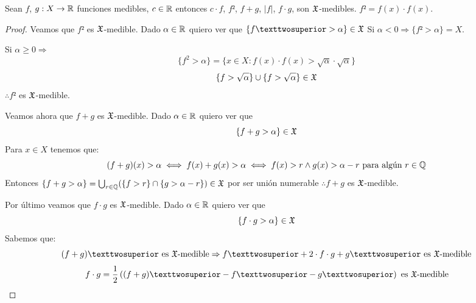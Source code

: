 \begin{lemma}
    Sean \(f\), \(g: X \to \mathbb{R}\) funciones medibles, \(c \in \mathbb{R}\) entonces \(c \cdot f\), \(f²\), \(f + g\), \(|f|\), \(f \cdot g\), son \(\mathfrak{X}\)-medibles.
    \(f² = f(x) \cdot f(x)\).
    \begin{proof}
        Veamos que \(f²\) es \(\mathfrak{X}\)-medible. Dado \(\alpha \in \mathbb{R}\) quiero ver que \(\{ f² > \alpha \} \in \mf{X}\)
        Si \(\alpha < 0 \Rightarrow \{ f² > \alpha \} = X\).

        Si \(\alpha \geq 0 \Rightarrow\)
        \begin{equation*}
            \{ f^2 > \alpha \} = \{ x \in X : f(x) \cdot f(x) > \sqrt{\alpha} \cdot \sqrt{\alpha} \}
        \end{equation*}
        \begin{equation*}
            \{ f > \sqrt{\alpha} \} \cup \{ f > \sqrt{\alpha} \} \in \mathfrak{X}
        \end{equation*} \(\therefore f²\) es \(\mathfrak{X}\)-medible.

        Veamos ahora que \(f + g\) es \(\mathfrak{X}\)-medible. Dado \(\alpha \in \mathbb{R}\) quiero ver que \begin{equation*}
            \{ f + g > \alpha \} \in \mathfrak{X}
        \end{equation*}
        Para \(x \in X\) tenemos que: \begin{equation*}
            (f+g)(x) > \alpha \iff f(x) + g(x) > \alpha \iff f(x) > r \land g(x) > \alpha - r \text{ para algún } r \in \mathbb{Q}
        \end{equation*}
        Entonces \(\{ f + g > \alpha \} = \bigcup_{r \in \mathbb{Q}} (\{ f > r \} \cap \{ g > \alpha - r \}) \in \mathfrak{X}\) por ser unión numerable \(\therefore f+g\) es \(\mathfrak{X}\)-medible.

        Por último veamos que \(f \cdot g\) es \(\mathfrak{X}\)-medible. Dado \(\alpha \in \mathbb{R}\) quiero ver que \begin{equation*}
            \{ f \cdot g > \alpha \} \in \mathfrak{X}
        \end{equation*}
        Sabemos que:
        \begin{equation*}
            (f+g)² \text{ es } \mf{X} \text{-medible} \Rightarrow f² + 2 \cdot f \cdot g + g² \text{ es } \mf{X} \text{-medible}
        \end{equation*}
        \begin{equation*}
            f \cdot g = \frac{1}{2} \left( (f+g)² - f² - g² \right) \text{ es } \mf{X} \text{-medible}
        \end{equation*}
    \end{proof}
\end{lemma}

